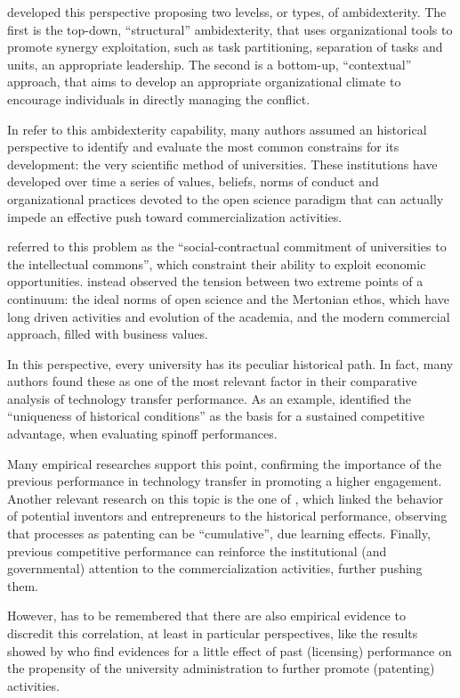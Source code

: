 \citet{Chang2016} developed this perspective proposing two levelss, or types, of ambidexterity. The first is the top-down, \enquote{structural} ambidexterity, that uses organizational tools to promote synergy exploitation, such as task partitioning, separation of tasks and units, an appropriate leadership. The second is a bottom-up, \enquote{contextual} approach, that aims to develop an appropriate organizational climate to encourage individuals in directly managing the conflict.

In refer to this ambidexterity capability, many authors assumed an historical perspective to identify and evaluate the most common constrains for its development: the very scientific method of universities. These institutions have developed over time a series of values, beliefs, norms of conduct and organizational practices devoted to the open science paradigm that can actually impede an effective push toward commercialization activities. 

\citet{Argyres1998} referred to this problem as the \enquote{social-contractual commitment of universities to the intellectual commons}, which constraint their ability to exploit economic opportunities. \citet{Muscio2013} instead observed the tension between two extreme points of a continuum: the ideal norms of open science and the Mertonian ethos, which have long driven activities and evolution of the academia, and the modern commercial approach, filled with business values.

In this perspective, every university has its peculiar historical path. In fact, many authors found these as one of the most relevant factor in their comparative analysis of technology transfer performance. As an example, \citet{OShea2005} identified the \enquote{uniqueness of historical conditions} as the basis for a sustained competitive advantage, when evaluating spinoff performances. 

Many empirical researches support this point, confirming the importance of the previous performance in technology transfer in promoting a higher engagement. Another relevant research on this topic is the one of \citet{Baldini2006}, which linked the behavior of potential inventors and entrepreneurs to the historical performance, observing that processes as patenting can be \enquote{cumulative}, due learning effects. Finally, previous competitive performance can reinforce the institutional (and governmental) attention to the commercialization activities, further pushing them.

However, has to be remembered that there are also empirical evidence to discredit this correlation, at least in particular perspectives, like the results showed by \citet{Thursby2002} who find evidences for a little effect of past (licensing) performance on the propensity of the university administration to further promote (patenting) activities.

